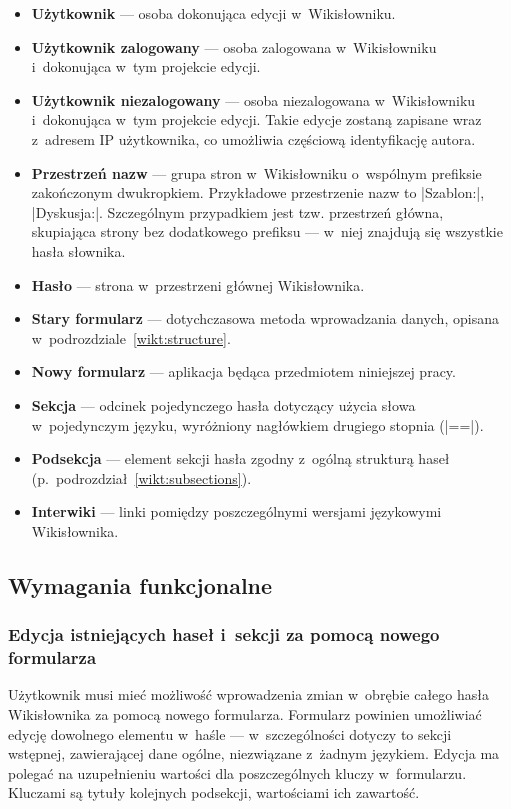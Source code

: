 \begin{itemize}
\item \textbf{Użytkownik} --- osoba dokonująca edycji w~Wikisłowniku.
\item \textbf{Użytkownik zalogowany} --- osoba zalogowana w~Wikisłowniku i~dokonująca w~tym projekcie edycji.
\item \textbf{Użytkownik niezalogowany} --- osoba niezalogowana w~Wikisłowniku i~dokonująca w~tym projekcie edycji. Takie edycje zostaną zapisane wraz z~adresem IP użytkownika, co umożliwia częściową identyfikację autora.
\item \textbf{Przestrzeń nazw} --- grupa stron w~Wikisłowniku o~wspólnym prefiksie zakończonym dwukropkiem. Przykładowe przestrzenie nazw to \kod|Szablon:|, \kod|Dyskusja:|. Szczególnym przypadkiem jest tzw. przestrzeń główna, skupiająca strony bez dodatkowego prefiksu --- w~niej znajdują się wszystkie hasła słownika.
\item \textbf{Hasło} --- strona w~przestrzeni głównej Wikisłownika.
\item \textbf{Stary formularz} --- dotychczasowa metoda wprowadzania danych, opisana w~podrozdziale~\ref{wikt:structure}.
\item \textbf{Nowy formularz} --- aplikacja będąca przedmiotem niniejszej pracy.
\item \textbf{Sekcja} --- odcinek pojedynczego hasła dotyczący użycia słowa w~pojedynczym języku, wyróżniony nagłówkiem drugiego stopnia (\kod|==|).
\item \textbf{Podsekcja} --- element sekcji hasła zgodny z~ogólną strukturą haseł (p.~podrozdział~\ref{wikt:subsections}).
\item \textbf{Interwiki} --- linki pomiędzy poszczególnymi wersjami językowymi Wikisłownika.
\end{itemize}

\subsection{Wymagania funkcjonalne}
\subsubsection{Edycja istniejących haseł i~sekcji za pomocą nowego formularza}
Użytkownik musi mieć możliwość wprowadzenia zmian w~obrębie całego hasła Wikisłownika za pomocą nowego formularza. Formularz powinien umożliwiać edycję dowolnego elementu w~haśle --- w~szczególności dotyczy to sekcji wstępnej, zawierającej dane ogólne, niezwiązane z~żadnym językiem. Edycja ma polegać na uzupełnieniu wartości dla poszczególnych kluczy w~formularzu. Kluczami są tytuły kolejnych podsekcji, wartościami ich zawartość.

